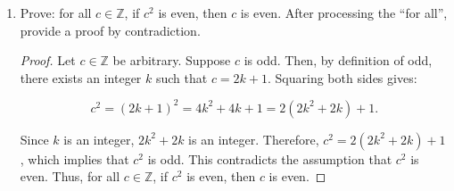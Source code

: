 \documentclass{article}
\begin{document}
\begin{enumerate}
            \begin{proof}
                  Let $c \in \mathbb{Z}$ be arbitrary. Suppose $c$ is odd. Then, by definition of odd, there exists an integer $k$ such that $c = 2k + 1$.
                  Squaring both sides gives $c^2 = {(2k + 1)}^2 = 4k^2 + 4k + 1 = 2(2k^2 + 2k) + 1$.
                  Since $k$ is an integer, $2k^2 + 2k$ is an integer. Therefore, $c^2 = 2(2k^2 + 2k) + 1$, which implies that $c^2$ is odd.
                  Therefore, for all $c \in \mathbb{Z}$, if $c$ is odd, then $c^2$ is odd.
                  Since we have proven the contrapositive of the original statement, we know the original statement must also be true.
                  Thus, for all $c \in \mathbb{Z}$, if $c^2$ is even, then $c$ is even.
            \end{proof}

            \newpage

      \item Prove: for all $c \in \mathbb{Z}$, if $c^2$ is even, then $c$ is even. After
            processing the ``for all'', provide a proof by contradiction.

            \begin{proof}
                  Let $c \in \mathbb{Z}$ be arbitrary. Suppose $c$ is odd.
                  Then, by definition of odd, there exists an integer $k$ such that $c = 2k + 1$.
                  Squaring both sides gives:

                  \[
                        c^2 = {(2k + 1)}^2 = 4k^2 + 4k + 1 = 2(2k^2 + 2k) + 1.
                  \]

                  Since $k$ is an integer, $2k^2 + 2k$ is an integer. Therefore, $c^2 = 2(2k^2 +
                        2k) + 1$, which implies that $c^2$ is odd. This contradicts the assumption that
                  $c^2$ is even. Thus, for all $c \in \mathbb{Z}$, if $c^2$ is even, then $c$ is
                  even.
            \end{proof}

\end{enumerate}
\end{document}
